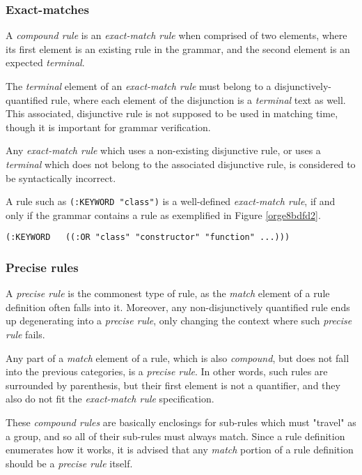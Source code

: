 \documentclass[a4paper,11pt,oneside]{article}
\begin{document}
\subsubsection*{Exact-matches}
\label{sec:org5c62779}

A \emph{compound rule} is an \emph{exact-match rule} when comprised of two elements,
where its first element is an existing rule in the grammar, and the
second element is an expected \emph{terminal}.

The \emph{terminal} element of an \emph{exact-match rule} must belong to a
disjunctively-quantified rule, where each element of the disjunction
is a \emph{terminal} text as well. This associated, disjunctive rule is not
supposed to be used in matching time, though it is important for
grammar verification.

Any \emph{exact-match rule} which uses a non-existing disjunctive rule, or
uses a \emph{terminal} which does not belong to the associated disjunctive
rule, is considered to be syntactically incorrect.

A rule such as \texttt{(:KEYWORD "class")} is a well-defined \emph{exact-match rule},
if and only if the grammar contains a rule as exemplified in Figure
\ref{orge8bdfd2}.

\begin{verbatim}
(:KEYWORD   ((:OR "class" "constructor" "function" ...)))
\end{verbatim}

\subsubsection*{Precise rules}
\label{sec:org42c1161}

A \emph{precise rule} is the commonest type of rule, as the \emph{match}
element of a rule definition often falls into it. Moreover, any
non-disjunctively quantified rule ends up degenerating into a \emph{precise
rule}, only changing the context where such \emph{precise rule} fails.

Any part of a \emph{match} element of a rule, which is also \emph{compound}, but
does not fall into the previous categories, is a \emph{precise rule}. In
other words, such rules are surrounded by parenthesis, but their first
element is not a quantifier, and they also do not fit the \emph{exact-match
rule} specification.

These \emph{compound rules} are basically enclosings for sub-rules which must
"travel" as a group, and so all of their sub-rules must always
match. Since a rule definition enumerates how it works, it is advised
that any \emph{match} portion of a rule definition should be a \emph{precise rule}
itself.
\end{document}
